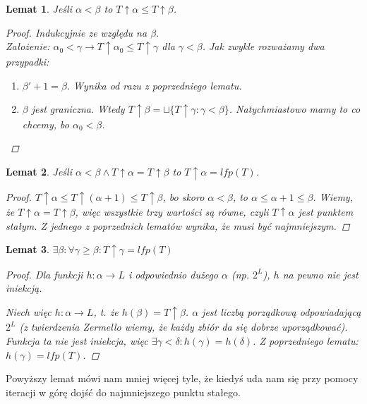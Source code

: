 \documentclass[10pt,a4paper]{article}
\theoremstyle{plain}
\newtheorem{lemma}{Lemat}
\theoremstyle{definition}
\newcommand{\impl}{\rightarrow}
\begin{document}
\begin{lemma}
 Jeśli $\alpha < \beta$ to $T \uparrow \alpha \leq T \uparrow \beta$.
 \begin{proof}
  Indukcyjnie ze względu na $\beta$.\\
  Założenie: $\alpha_0 < \gamma \impl T \uparrow \alpha_0 \leq T \uparrow \gamma$ dla $\gamma < \beta$.
  Jak zwykle rozważamy dwa przypadki:
  \begin{enumerate}
  \item $\beta' + 1 = \beta$. Wynika od razu z poprzedniego lematu.
  \item $\beta$ jest graniczna. Wtedy $T \uparrow \beta = \sqcup \lbrace
	 T \uparrow \gamma : \gamma < \beta \rbrace$. Natychmiastowo mamy to co chcemy, 
	 bo $\alpha_0 < \beta$.
 \end{enumerate}
 \end{proof}
\end{lemma}

\begin{lemma}
 Jeśli $\alpha < \beta \land T \uparrow \alpha = T \uparrow \beta$ to $T \uparrow \alpha = lfp(T)$.
 \begin{proof}
  $T \uparrow \alpha \leq T \uparrow (\alpha + 1) \leq T \uparrow \beta$, bo skoro $\alpha < \beta$, to 
  $\alpha \leq \alpha +1 \leq \beta$. Wiemy, że $T \uparrow \alpha = T \uparrow \beta$, więc wszystkie trzy 
  wartości są równe, czyli $T \uparrow \alpha$ jest punktem stałym. Z jednego z poprzednich lematów wynika, że 
  musi być najmniejszym.
 \end{proof}
\end{lemma}

\begin{lemma}
 $\exists \beta : \forall \gamma \geq \beta : T \uparrow \gamma = lfp(T)$
 \begin{proof}
  Dla funkcji $h : \alpha \to L$ i odpowiednio dużego $\alpha$ (np. $2^L$), $h$ na pewno nie jest iniekcją. 
  
  Niech więc $h : \alpha \to L$, t. że $h(\beta) = T \uparrow \beta$. $\alpha$ jest liczbą porządkową odpowiadającą
  $2^L$ (z twierdzenia Zermello wiemy, że każdy zbiór da się dobrze uporządkować). Funkcja ta nie jest iniekcja, więc 
  $\exists \gamma < \delta : h(\gamma) = h(\delta)$. Z poprzedniego lematu: $h(\gamma) = lfp(T)$.
 \end{proof}
\end{lemma}
Powyższy lemat mówi nam mniej więcej tyle, że kiedyś uda nam się przy pomocy iteracji w górę dojść do 
najmniejszego punktu stałego.
\end{document}
